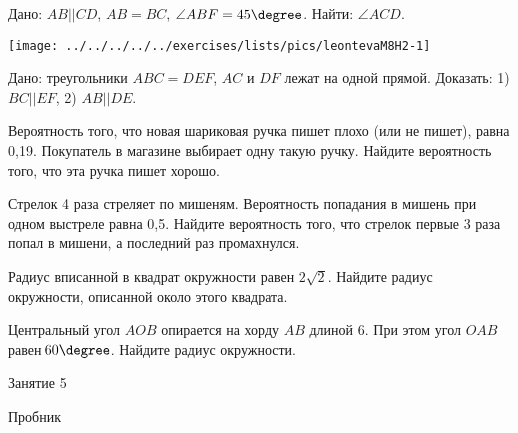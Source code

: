 \begin{homework}[number=2]
	\begin{listofex}
		\item 
		\begin{minipage}[t]{\bodywidth}
			Дано: \( AB || CD \), \( AB = BC \), \( \angle ABF = 45\degree \). Найти: \( \angle ACD \).
		\end{minipage}
		\hspace{0.02\linewidth}
		\begin{minipage}[t]{\picwidth}
			\texttt{[image: ../../../../../exercises/lists/pics/leontevaM8H2-1]}
		\end{minipage}
		\item Дано: треугольники \( ABC = DEF \), \( AC \) и \( DF \) лежат на одной прямой. Доказать: 1) \( BC || EF \), 2) \( AB || DE \).
		\item Вероятность того, что новая шариковая ручка пишет плохо (или не пишет), равна 0,19. Покупатель в магазине выбирает одну такую ручку. Найдите вероятность того, что эта ручка пишет хорошо.
		\item Стрелок 4 раза стреляет по мишеням. Вероятность попадания в мишень при одном выстреле равна 0,5. Найдите вероятность того, что стрелок первые 3 раза попал в мишени, а последний раз промахнулся.
		\item  Радиус вписанной в квадрат окружности равен \( 2\sqrt{2}  \). Найдите радиус окружности, описанной около этого квадрата.
		\item Центральный угол \( AOB \) опирается на хорду \( AB \) длиной 6. При этом угол \( OAB \) равен \( 60\degree \). Найдите радиус окружности.
	\end{listofex}
\end{homework}

\begin{class}[number=5]
	\begin{listofex}
		\item Занятие 5
	\end{listofex}
\end{class}

\begin{class}[number=6]
	\begin{listofex}
			\item Пробник
	\end{listofex}
\end{class}

